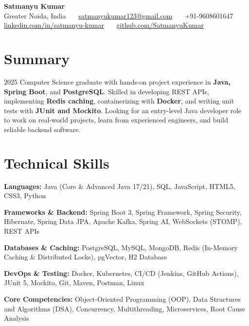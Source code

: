 \documentclass[letterpaper,10pt]{article}
\begin{document}
\begin{center}
    {\LARGE \textbf{Satmanyu Kumar}} \\ \vspace{3pt}
    \small 
    Greater Noida, India \ \textbullet\ \ 
    \href{mailto:satmanyukumar123@gmail.com}{\underline{satmanyukumar123@gmail.com}} \ \textbullet\ \ 
    +91-9608601647 \\ \vspace{2pt}
    \href{https://linkedin.com/in/satmanyu-kumar}{\underline{linkedin.com/in/satmanyu-kumar}} \ \textbullet\ \ 
    \href{https://github.com/SatmanyuKumar}{\underline{github.com/SatmanyuKumar}}
    \vspace{-4pt}
\end{center}

\section{Summary}
\vspace{2pt}
\small{2025 Computer Science graduate with hands-on project experience in \textbf{Java, Spring Boot}, and \textbf{PostgreSQL}. Skilled in developing REST APIs, implementing \textbf{Redis caching}, containerizing with \textbf{Docker}, and writing unit tests with \textbf{JUnit and Mockito}. Looking for an entry-level Java developer role to work on real-world projects, learn from experienced engineers, and build reliable backend software.}
\vspace{2pt}

\section{Technical Skills}
\begin{itemize}[leftmargin=0.15in, label={}, itemsep=1.5pt, topsep=2pt]
    \small{
    \item \textbf{Languages:} Java (Core \& Advanced Java 17/21), SQL, JavaScript, HTML5, CSS3, Python
    \item \textbf{Frameworks \& Backend:} Spring Boot 3, Spring Framework, Spring Security, Hibernate, Spring Data JPA, Apache Kafka, Spring AI, WebSockets (STOMP), REST APIs
    \item \textbf{Databases \& Caching:} PostgreSQL, MySQL, MongoDB, Redis (In-Memory Caching \& Distributed Locks), pgVector, H2 Database
    \item \textbf{DevOps \& Testing:} Docker, Kubernetes, CI/CD (Jenkins, GitHub Actions), JUnit 5, Mockito, Git, Maven, Postman, Linux
    \item \textbf{Core Competencies:} Object-Oriented Programming (OOP), Data Structures and Algorithms (DSA), Concurrency, Multithreading, Microservices, Root Cause Analysis
    }
\end{itemize}
\vspace{-8pt}
\end{document}
